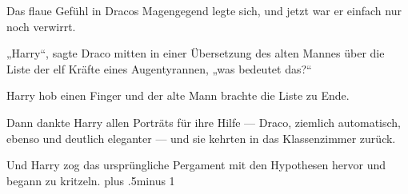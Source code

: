 Das flaue Gefühl in Dracos Magengegend legte sich, und jetzt war er einfach nur noch verwirrt.

„Harry“, sagte Draco mitten in einer Übersetzung des alten Mannes über die Liste der elf Kräfte eines Augentyrannen, „was bedeutet das?“

Harry hob einen Finger und der alte Mann brachte die Liste zu Ende.

Dann dankte Harry allen Porträts für ihre Hilfe — Draco, ziemlich automatisch, ebenso und deutlich eleganter — und sie kehrten in das Klassenzimmer zurück.

Und Harry zog das ursprüngliche Pergament mit den Hypothesen hervor und begann zu kritzeln.
\baselineskip plus .5\textheight minus 1\baselineskip

\savetrivseps
\setlength{\topsep}{0pt}
\setlength{\partopsep}{0pt}

